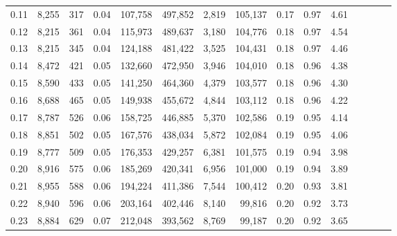 \begin{tabular}{rrrcrrrrrrrrrrr}
0.11 &   8,255 &    317 &                                       0.04 &  107,758 &  497,852 &    2,819 &  105,137 &  0.17 &  0.97 &                         4.61 \\
0.12 &   8,215 &    361 &                                       0.04 &  115,973 &  489,637 &    3,180 &  104,776 &  0.18 &  0.97 &                         4.54 \\
0.13 &   8,215 &    345 &                                       0.04 &  124,188 &  481,422 &    3,525 &  104,431 &  0.18 &  0.97 &                         4.46 \\
0.14 &   8,472 &    421 &                                       0.05 &  132,660 &  472,950 &    3,946 &  104,010 &  0.18 &  0.96 &                         4.38 \\
0.15 &   8,590 &    433 &                                       0.05 &  141,250 &  464,360 &    4,379 &  103,577 &  0.18 &  0.96 &                         4.30 \\
0.16 &   8,688 &    465 &                                       0.05 &  149,938 &  455,672 &    4,844 &  103,112 &  0.18 &  0.96 &                         4.22 \\
0.17 &   8,787 &    526 &                                       0.06 &  158,725 &  446,885 &    5,370 &  102,586 &  0.19 &  0.95 &                         4.14 \\
0.18 &   8,851 &    502 &                                       0.05 &  167,576 &  438,034 &    5,872 &  102,084 &  0.19 &  0.95 &                         4.06 \\
0.19 &   8,777 &    509 &                                       0.05 &  176,353 &  429,257 &    6,381 &  101,575 &  0.19 &  0.94 &                         3.98 \\
0.20 &   8,916 &    575 &                                       0.06 &  185,269 &  420,341 &    6,956 &  101,000 &  0.19 &  0.94 &                         3.89 \\
0.21 &   8,955 &    588 &                                       0.06 &  194,224 &  411,386 &    7,544 &  100,412 &  0.20 &  0.93 &                         3.81 \\
0.22 &   8,940 &    596 &                                       0.06 &  203,164 &  402,446 &    8,140 &   99,816 &  0.20 &  0.92 &                         3.73 \\
0.23 &   8,884 &    629 &                                       0.07 &  212,048 &  393,562 &    8,769 &   99,187 &  0.20 &  0.92 &                         3.65 \\

\end{tabular}

